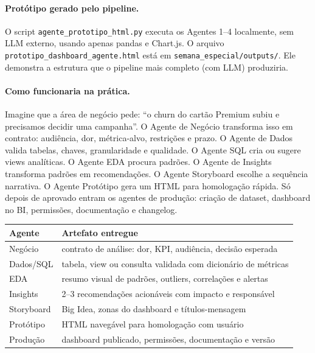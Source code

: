 \paragraph{Protótipo gerado pelo pipeline.}

O script \texttt{agente\_prototipo\_html.py} executa os Agentes 1--4 localmente, sem LLM externo, usando apenas pandas e Chart.js. O arquivo \texttt{prototipo\_dashboard\_agente.html} está em \texttt{semana\_especial/outputs/}. Ele demonstra a estrutura que o pipeline mais completo (com LLM) produziria.

\paragraph{Como funcionaria na prática.}
Imagine que a área de negócio pede: ``o churn do cartão Premium subiu e precisamos decidir uma campanha''. O Agente de Negócio transforma isso em contrato: audiência, dor, métrica-alvo, restrições e prazo. O Agente de Dados valida tabelas, chaves, granularidade e qualidade. O Agente SQL cria ou sugere views analíticas. O Agente EDA procura padrões. O Agente de Insights transforma padrões em recomendações. O Agente Storyboard escolhe a sequência narrativa. O Agente Protótipo gera um HTML para homologação rápida. Só depois de aprovado entram os agentes de produção: criação de dataset, dashboard no BI, permissões, documentação e changelog.

\begin{BoardBox}[title=Artefatos por Agente]
\begin{tabular}{@{}lp{8.7cm}@{}}
\toprule
\textbf{Agente} & \textbf{Artefato entregue} \\
\midrule
Negócio & contrato de análise: dor, KPI, audiência, decisão esperada \\
Dados/SQL & tabela, view ou consulta validada com dicionário de métricas \\
EDA & resumo visual de padrões, outliers, correlações e alertas \\
Insights & 2--3 recomendações acionáveis com impacto e responsável \\
Storyboard & Big Idea, zonas do dashboard e títulos-mensagem \\
Protótipo & HTML navegável para homologação com usuário \\
Produção & dashboard publicado, permissões, documentação e versão \\
\bottomrule
\end{tabular}
\end{BoardBox}

